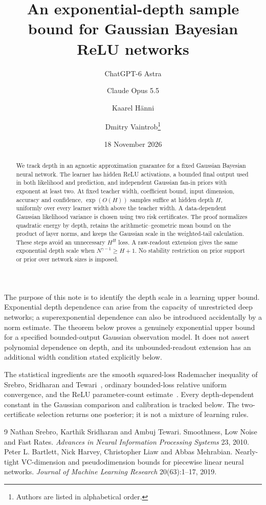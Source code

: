 \documentclass[11pt]{article}
\title{An exponential-depth sample bound for Gaussian Bayesian ReLU networks}
\author{ChatGPT-6 Astra \and Claude Opus 5.5 \and Kaarel H\"anni \and Dmitry Vaintrob\thanks{Authors are listed in alphabetical order.}}
\date{18 November 2026}
\begin{document}
\maketitle
\begin{abstract}
We track depth in an agnostic approximation guarantee for a fixed Gaussian Bayesian neural network. The learner has hidden ReLU activations, a bounded final output used in both likelihood and prediction, and independent Gaussian fan-in priors with exponent at least two. At fixed teacher width, coefficient bound, input dimension, accuracy and confidence, $\exp(O(H))$ samples suffice at hidden depth $H$, uniformly over every learner width above the teacher width. A data-dependent Gaussian likelihood variance is chosen using two risk certificates. The proof normalizes quadratic energy by depth, retains the arithmetic--geometric mean bound on the product of layer norms, and keeps the Gaussian scale in the weighted-tail calculation. These steps avoid an unnecessary $H^H$ loss. A raw-readout extension gives the same exponential depth scale when $N^{\gamma-1}\ge H+1$. No stability restriction on prior support or prior over network sizes is imposed.
\end{abstract}
The purpose of this note is to identify the depth scale in a learning upper bound. Exponential depth dependence can arise from the capacity of unrestricted deep networks; a superexponential dependence can also be introduced accidentally by a norm estimate. The theorem below proves a genuinely exponential upper bound for a specified bounded-output Gaussian observation model. It does not assert polynomial dependence on depth, and its unbounded-readout extension has an additional width condition stated explicitly below.

The statistical ingredients are the smooth squared-loss Rademacher inequality of Srebro, Sridharan and Tewari~\cite{sst}, ordinary bounded-loss relative uniform convergence, and the ReLU parameter-count estimate~\cite{bartlett}. Every depth-dependent constant in the Gaussian comparison and calibration is tracked below. The two-certificate selection returns one posterior; it is not a mixture of learning rules.



\begin{thebibliography}{9}
 Nathan Srebro, Karthik Sridharan and Ambuj Tewari. Smoothness, Low Noise and Fast Rates. \emph{Advances in Neural Information Processing Systems} 23, 2010.
 Peter L. Bartlett, Nick Harvey, Christopher Liaw and Abbas Mehrabian. Nearly-tight VC-dimension and pseudodimension bounds for piecewise linear neural networks. \emph{Journal of Machine Learning Research} 20(63):1--17, 2019.
\end{thebibliography}
\end{document}
